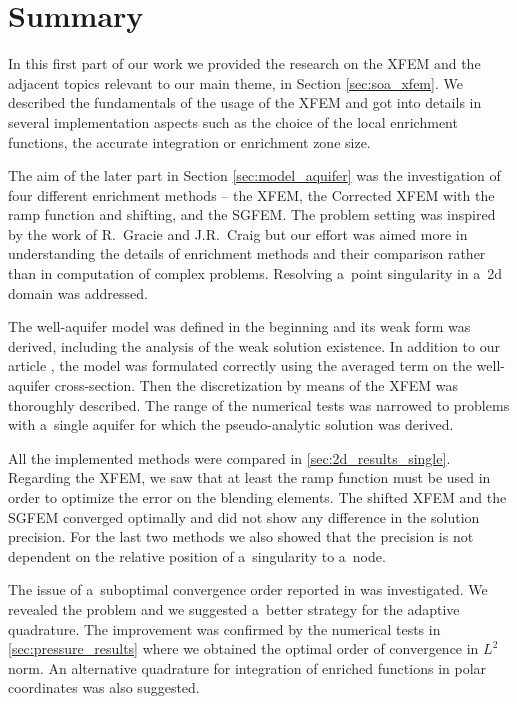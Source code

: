 \section{Summary}
\label{sec:summary}

In this first part of our work we provided the research on the XFEM and the adjacent topics relevant to our main theme, in Section \ref{sec:soa_xfem}.
We described the fundamentals of the usage of the XFEM and got into details in several implementation aspects such as
the choice of the local enrichment functions, the accurate integration or enrichment zone size.

The aim of the later part in Section \ref{sec:model_aquifer} was the investigation of four different enrichment methods
-- the XFEM, the Corrected XFEM with the ramp function and shifting, and the SGFEM. 
The problem setting was inspired by the work \cite{gracie_modelling_2010,craig_using_2011} 
of R.~Gracie and J.R.~Craig but our effort was aimed more in understanding the details of enrichment methods and their comparison
rather than in computation of complex problems. Resolving a~point singularity in a~2d domain was addressed.

The well-aquifer model was defined in the beginning and its weak form was derived, including the analysis of the weak solution existence.
In addition to our article \cite{exner_2016}, the model was formulated correctly using the averaged term on the well-aquifer
cross-section. Then the discretization by means of the XFEM was thoroughly described.
The range of the numerical tests was narrowed to problems with a~single aquifer for which the pseudo-analytic solution was derived.

All the implemented methods were compared in \ref{sec:2d_results_single}. Regarding the XFEM, we saw that at 
least the ramp function must be used in order to optimize the error on the blending elements. 
The shifted XFEM and the SGFEM converged optimally and did not show any difference in the solution precision.
For the last two methods we also showed that the precision is not dependent on the relative position of a~singularity to a~node.

The issue of a~suboptimal convergence order reported in \cite{gracie_modelling_2010} was investigated. 
We revealed the problem and we suggested a~better strategy for the adaptive quadrature. 
The improvement was confirmed by the numerical tests in \ref{sec:pressure_results} where we obtained the optimal 
order of convergence in $L^2$ norm.
An alternative quadrature for integration of enriched functions in polar coordinates was also suggested.

